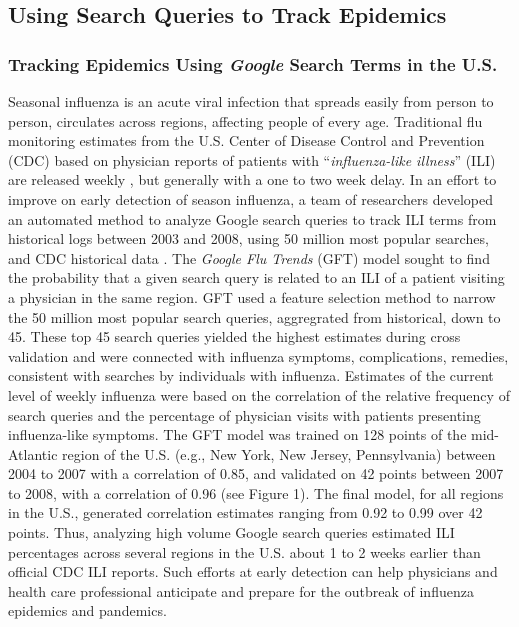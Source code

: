 \documentclass[sigconf]{acmart}
\begin{document}
\subsection{Using Search Queries to Track Epidemics}

\subsubsection{Tracking Epidemics Using {\itshape Google} Search Terms in the U.S.}

Seasonal influenza is an acute viral infection that spreads easily from person to 
person, circulates across regions, affecting people of every age. Traditional flu 
monitoring estimates from the U.S. Center of Disease Control and Prevention (CDC) 
based on physician reports of patients with ``{\it influenza-like illness}'' (ILI) are 
released weekly \cite{cdc17}, but generally with a one to two week delay. In an effort 
to improve on early detection of season influenza, a team of researchers developed an 
automated method to analyze Google search queries to track ILI terms from historical 
logs between 2003 and 2008, using 50 million most popular searches, and CDC historical 
data \cite{ginsburg09}. The {\it Google Flu Trends} (GFT) model \cite{gft09} sought to 
find the probability that a given search query is related to an ILI of a patient visiting 
a physician in the same region. GFT used a feature selection method to narrow the 50 
million most popular search queries, aggregrated from historical, down to 45. These 
top 45 search queries yielded the highest estimates during cross validation and were 
connected with influenza symptoms, complications, remedies, consistent with searches 
by individuals with influenza. Estimates of the current level of weekly influenza were 
based on the correlation of the relative frequency of search queries and the percentage 
of physician visits with patients presenting influenza-like symptoms. The GFT model was 
trained on 128 points of the mid-Atlantic region of the U.S. (e.g., New York, New Jersey, 
Pennsylvania) between 2004 to 2007 with a correlation of 0.85, and validated on 42 points 
between 2007 to 2008, with a correlation of 0.96 (see Figure 1). The final model, for 
all regions in the U.S., generated correlation estimates ranging from 0.92 to 0.99 over 
42 points. Thus, analyzing high volume Google search queries estimated ILI percentages 
across several regions in the U.S. about 1 to 2 weeks earlier than official CDC ILI 
reports. Such efforts at early detection can help physicians and health care professional 
anticipate and prepare for the outbreak of influenza epidemics and pandemics. 
\end{document}
